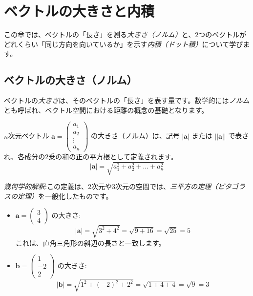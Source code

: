 \section{ベクトルの大きさと内積} \setcounter{ex}{0}

この章では、ベクトルの「長さ」を測る\emph{大きさ（ノルム）}と、2つのベクトルがどれくらい「同じ方向を向いているか」を示す\emph{内積（ドット積）}について学びます。

\subsection{ベクトルの大きさ（ノルム）}

ベクトルの\emph{大きさ}は、そのベクトルの「長さ」を表す量です。数学的には\emph{ノルム}とも呼ばれ、ベクトル空間における距離の概念の基礎となります。

\begin{dfn}
$n$次元ベクトル $\bm{a} = \begin{pmatrix} a_1 \\ a_2 \\ \vdots \\ a_n \end{pmatrix}$ の大きさ（ノルム）は、記号 $|\bm{a}|$ または $||\bm{a}||$ で表され、各成分の2乗の和の正の平方根として定義されます。
\[|\bm{a}| = \sqrt{a_1^2 + a_2^2 + \dots + a_n^2}\]
\end{dfn}

\emph{幾何学的解釈}:この定義は、2次元や3次元の空間では、\emph{三平方の定理（ピタゴラスの定理）}を一般化したものです。

\begin{ex}
\begin{itemize}
\item $\bm{a} = \begin{pmatrix} 3 \\ 4 \end{pmatrix}$ の大きさ:
    \[|\bm{a}| = \sqrt{3^2 + 4^2} = \sqrt{9 + 16} = \sqrt{25} = 5\]
    これは、直角三角形の斜辺の長さと一致します。
\item $\bm{b} = \begin{pmatrix} 1 \\ -2 \\ 2 \end{pmatrix}$ の大きさ:
    \[|\bm{b}| = \sqrt{1^2 + (-2)^2 + 2^2} = \sqrt{1 + 4 + 4} = \sqrt{9} = 3\]
\end{itemize}
\end{ex}

